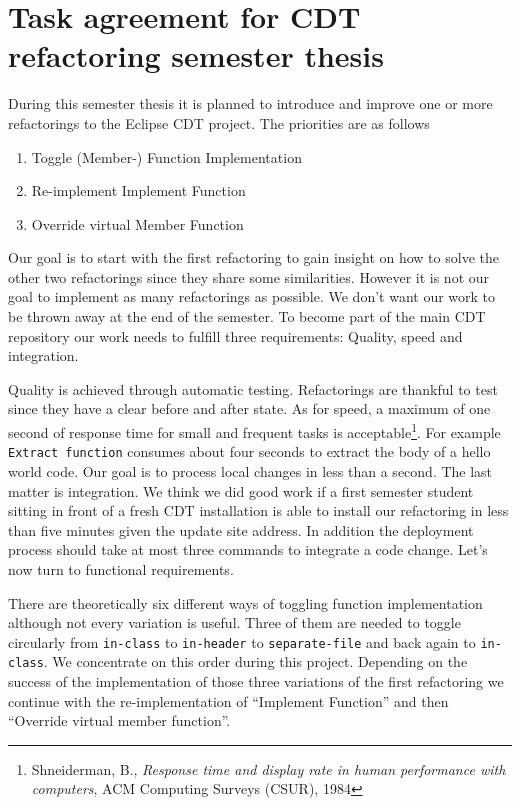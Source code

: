 \documentclass[a4paper,10pt]{scrreprt}
\begin{document}
\section*{Task agreement for CDT refactoring semester thesis}

During this semester thesis it is planned to introduce and improve one or more
refactorings to the Eclipse CDT project. The priorities are as follows

\begin{enumerate}
\item Toggle (Member-) Function Implementation
\item Re-implement Implement Function
\item Override virtual Member Function
\end{enumerate}

Our goal is to start with the first refactoring to gain insight on how to solve
the other two refactorings since they share some similarities. However it is not
our goal to implement as many refactorings as possible. We don't want our work
to be thrown away at the end of the semester. To become part of the main CDT
repository our work needs to fulfill three requirements: Quality, speed and
integration. 

Quality is achieved through automatic testing. Refactorings are thankful to test since they have a clear before and after state. As for speed, a maximum of one second of response time for small and frequent tasks is acceptable\footnote{Shneiderman, B., \emph{Response time and display rate in human performance with computers}, ACM Computing Surveys (CSUR), 1984}. For example \texttt{Extract function} consumes about four seconds to extract the body of a hello world code. Our goal is to process local changes in less than a second. The last matter is integration. We think we did good work if a first semester student sitting in front of a fresh CDT installation is able to install our refactoring in less than five minutes given the update site address. In addition the deployment process should take at most three commands to integrate a code change. Let's now turn to functional requirements. \newline

There are theoretically six different ways of toggling function implementation
although not every variation is useful. Three of them are needed to toggle
circularly from \texttt{in-class} to \texttt{in-header} to
\texttt{separate-file}  and back again to \texttt{in-class}. We concentrate on
this order during this project.\newline
Depending on the success of the implementation of those three variations of the
first refactoring we continue with the re-implementation of  ``Implement
Function'' and then ``Override virtual member function''.
\end{document}
